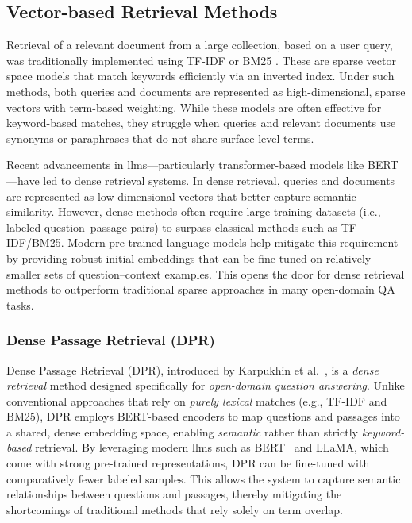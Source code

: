 \subsection{Vector-based Retrieval Methods}


Retrieval of a relevant document from a large collection, based on a user query, was traditionally implemented using TF-IDF or BM25 \cite{bm25}. These are sparse vector space models that match keywords efficiently via an inverted index. Under such methods, both queries and documents are represented as high-dimensional, sparse vectors with term-based weighting. While these models are often effective for keyword-based matches, they struggle when queries and relevant documents use synonyms or paraphrases that do not share surface-level terms.

Recent advancements in \glspl{llm}—particularly transformer-based models like BERT \cite{bertpretrainingdeepbidirectional}—have led to dense retrieval systems. In dense retrieval, queries and documents are represented as low-dimensional vectors that better capture semantic similarity. However, dense methods often require large training datasets (i.e., labeled question–passage pairs) to surpass classical methods such as TF-IDF/BM25. Modern pre-trained language models help mitigate this requirement by providing robust initial embeddings that can be fine-tuned on relatively smaller sets of question–context examples. This opens the door for dense retrieval methods to outperform traditional sparse approaches in many open-domain QA tasks.
\subsubsection{Dense Passage Retrieval (DPR)}
\label{par:dpr}
Dense Passage Retrieval (DPR), introduced by Karpukhin et al.~\cite{densepassageretrievalopendomainkarpukhin2020}, is a \textit{dense retrieval} method designed specifically for \textit{open-domain question answering}. Unlike conventional approaches that rely on \textit{purely lexical} matches (e.g., TF-IDF and BM25), DPR employs BERT-based encoders to map questions and passages into a shared, dense embedding space, enabling \textit{semantic} rather than strictly \textit{keyword-based} retrieval. By leveraging modern \glspl{llm} such as BERT~\cite{bertpretrainingdeepbidirectional} and LLaMA, which come with strong pre-trained representations, DPR can be fine-tuned with comparatively fewer labeled samples. This allows the system to capture semantic relationships between questions and passages, thereby mitigating the shortcomings of traditional methods that rely solely on term overlap.

